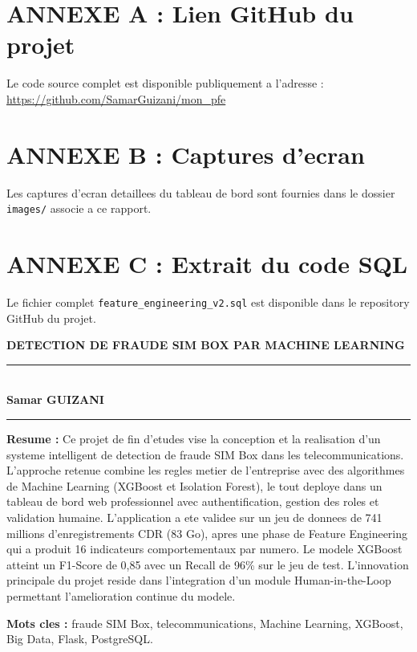 \documentclass[12pt, oneside, a4paper]{report}
\begin{document}
\section*{ANNEXE A : Lien GitHub du projet}
Le code source complet est disponible publiquement a l'adresse :\\
\url{https://github.com/SamarGuizani/mon_pfe}

\section*{ANNEXE B : Captures d'ecran}
Les captures d'ecran detaillees du tableau de bord sont fournies dans le dossier \texttt{images/} associe a ce rapport.

\section*{ANNEXE C : Extrait du code SQL}
Le fichier complet \texttt{feature\_engineering\_v2.sql} est disponible dans le repository GitHub du projet.

\thispagestyle{empty}
\begin{center}
\textbf{DETECTION DE FRAUDE SIM BOX PAR MACHINE LEARNING}\\[0.5em]
\rule{8cm}{1pt}\\[0.5em]
\textbf{Samar GUIZANI}\\
\rule{8cm}{1pt}
\end{center}

\textbf{Resume :} Ce projet de fin d'etudes vise la conception et la realisation d'un systeme intelligent de detection de fraude SIM Box dans les telecommunications. L'approche retenue combine les regles metier de l'entreprise avec des algorithmes de Machine Learning (XGBoost et Isolation Forest), le tout deploye dans un tableau de bord web professionnel avec authentification, gestion des roles et validation humaine. L'application a ete validee sur un jeu de donnees de 741 millions d'enregistrements CDR (83 Go), apres une phase de Feature Engineering qui a produit 16 indicateurs comportementaux par numero. Le modele XGBoost atteint un F1-Score de 0,85 avec un Recall de 96\% sur le jeu de test. L'innovation principale du projet reside dans l'integration d'un module Human-in-the-Loop permettant l'amelioration continue du modele.

\textbf{Mots cles :} fraude SIM Box, telecommunications, Machine Learning, XGBoost, Big Data, Flask, PostgreSQL.
\end{document}
